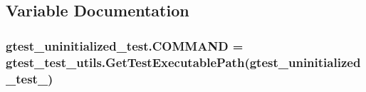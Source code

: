 \subsection{Variable Documentation}
\subsubsection[{\texorpdfstring{C\+O\+M\+M\+A\+ND}{COMMAND}}]{\setlength{\rightskip}{0pt plus 5cm}gtest\+\_\+uninitialized\+\_\+test.\+C\+O\+M\+M\+A\+ND = {\bf gtest\+\_\+test\+\_\+utils.\+Get\+Test\+Executable\+Path}(\textquotesingle{}gtest\+\_\+uninitialized\+\_\+test\+\_\+\textquotesingle{})}\hypertarget{namespacegtest__uninitialized__test_a77a36d59341a58a2e7f54f0b2e691bd7}{}\label{namespacegtest__uninitialized__test_a77a36d59341a58a2e7f54f0b2e691bd7}
